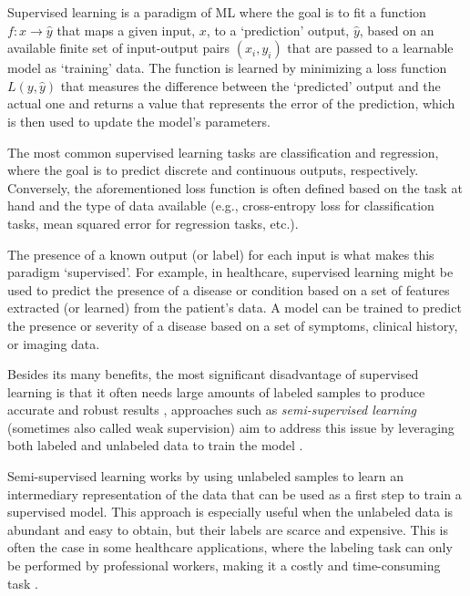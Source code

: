 \documentclass[../main.tex]{subfiles}
\begin{document}
    Supervised learning is a paradigm of ML where the goal is to fit a function $f: x \rightarrow \hat{y}$ that maps a given input, $x$, to a `prediction' output, $\hat{y}$, based on an available finite set of input-output pairs $(x_i, y_i)$ that are passed to a learnable model as `training' data. The function is learned by minimizing a loss function $L(y, \hat{y})$ that measures the difference between the `predicted' output and the actual one and returns a value that represents the error of the prediction, which is then used to update the model's parameters.

    The most common supervised learning tasks are classification and regression, where the goal is to predict discrete and continuous outputs, respectively. Conversely, the aforementioned loss function is often defined based on the task at hand and the type of data available (e.g., cross-entropy loss for classification tasks, mean squared error for regression tasks, etc.).

    The presence of a known output (or label) for each input is what makes this paradigm `supervised'. For example, in healthcare, supervised learning might be used to predict the presence of a disease or condition based on a set of features extracted (or learned) from the patient's data. A model can be trained to predict the presence or severity of a disease based on a set of symptoms, clinical history, or imaging data.

    Besides its many benefits, the most significant disadvantage of supervised learning is that it often needs large amounts of labeled samples to produce accurate and robust results \cite{lecun_deep_2015}, 
    approaches such as \textit{semi-supervised learning} (sometimes also called weak supervision) aim to address this issue by leveraging both labeled and unlabeled data to train the model \cite{zhu_semi-supervised_2008}. 
    
    Semi-supervised learning works by using unlabeled samples to learn an intermediary representation of the data that can be used as a first step to train a supervised model. This approach is especially useful when the unlabeled data is abundant and easy to obtain, but their labels are scarce and expensive. This is often the case in some healthcare applications, where the labeling task can only be performed by professional workers, making it a costly and time-consuming task \cite{yakimovich_labels_2021,chen_study_2015, figueroa_predicting_2012}.
    
    
\end{document}
